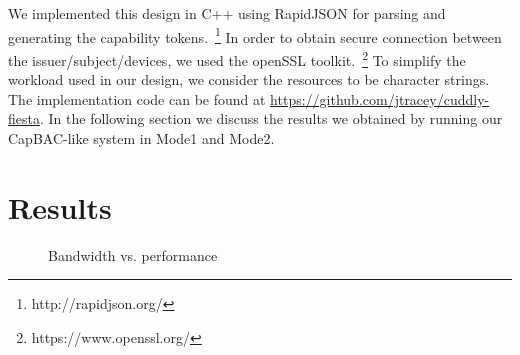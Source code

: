 We implemented this design in C++ using RapidJSON for parsing and generating the capability tokens.~\footnote{http://rapidjson.org/} In order to obtain secure connection between the issuer/subject/devices, we used the openSSL toolkit.~\footnote{https://www.openssl.org/} To simplify the workload used in our design, we consider the resources to be character strings. The implementation code can be found at \href{https://github.com/jtracey/cuddly-fiesta}{https://github.com/jtracey/cuddly-fiesta}. In the following section we discuss the results we obtained by running our CapBAC-like system in Mode1 and Mode2.
\section{Results}
\label{sec:results}


\begin{figure}[t]
\caption{Bandwidth vs. performance}
\label{fig:band}
\end{figure}

